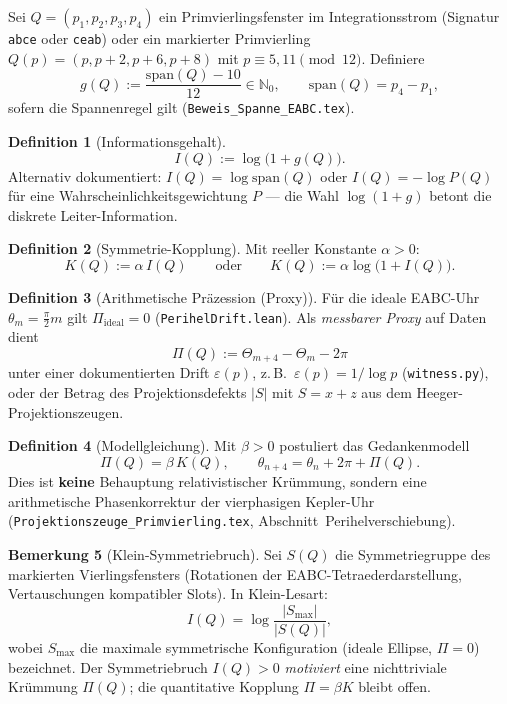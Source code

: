 \documentclass[11pt,a4paper]{article}
\theoremstyle{definition}
\newtheorem{definition}{Definition}[section]
\newtheorem{bemerkung}[definition]{Bemerkung}
\theoremstyle{remark}
\newcommand{\N}{\mathbb{N}}
\begin{document}
Sei $Q=(p_1,p_2,p_3,p_4)$ ein Primvierlingsfenster im Integrationsstrom
(Signatur \texttt{abce} oder \texttt{ceab}) oder ein markierter Primvierling
$Q(p)=(p,p+2,p+6,p+8)$ mit $p\equiv 5,11\pmod{12}$.
Definiere
\[
  g(Q):=\frac{\mathrm{span}(Q)-10}{12}\in\N_0,
  \qquad \mathrm{span}(Q)=p_4-p_1,
\]
sofern die Spannenregel gilt (\texttt{Beweis\_Spanne\_EABC.tex}).

\begin{definition}[Informationsgehalt]
  \[
  I(Q):=\log\bigl(1+g(Q)\bigr).
  \]
  Alternativ dokumentiert: $I(Q)=\log\mathrm{span}(Q)$ oder
  $I(Q)=-\log P(Q)$ für eine Wahrscheinlichkeitsgewichtung $P$ ---
  die Wahl $\log(1+g)$ betont die diskrete Leiter-Information.
\end{definition}

\begin{definition}[Symmetrie-Kopplung]
  Mit reeller Konstante $\alpha>0$:
  \[
  K(Q):=\alpha\,I(Q)
  \qquad\text{oder}\qquad
  K(Q):=\alpha\log\bigl(1+I(Q)\bigr).
  \]
\end{definition}

\begin{definition}[Arithmetische Präzession (Proxy)]
  Für die ideale EABC-Uhr $\theta_m=\tfrac{\pi}{2}m$ gilt
  $\Pi_{\mathrm{ideal}}=0$ (\texttt{PerihelDrift.lean}).
  Als \emph{messbarer Proxy} auf Daten dient
  \[
  \Pi(Q):=\Theta_{m+4}-\Theta_m-2\pi
  \]
  unter einer dokumentierten Drift $\varepsilon(p)$, z.\,B.\
  $\varepsilon(p)=1/\log p$ (\texttt{witness.py}), oder der Betrag des
  Projektionsdefekts $|S|$ mit $S=x+z$ aus dem Heeger-Projektionszeugen.
\end{definition}

\begin{definition}[Modellgleichung]
  Mit $\beta>0$ postuliert das Gedankenmodell
  \[
  \Pi(Q)=\beta\,K(Q),
  \qquad
  \theta_{n+4}=\theta_n+2\pi+\Pi(Q).
  \]
  Dies ist \textbf{keine} Behauptung relativistischer Krümmung, sondern eine
  arithmetische Phasenkorrektur der vierphasigen Kepler-Uhr
  (\texttt{Projektionszeuge\_Primvierling.tex}, Abschnitt~Perihelverschiebung).
\end{definition}

\begin{bemerkung}[Klein-Symmetriebruch]
  Sei $S(Q)$ die Symmetriegruppe des markierten Vierlingsfensters
  (Rotationen der EABC-Tetraederdarstellung, Vertauschungen kompatibler Slots).
  In Klein-Lesart:
  \[
  I(Q)=\log\frac{|S_{\max}|}{|S(Q)|},
  \]
  wobei $S_{\max}$ die maximale symmetrische Konfiguration (ideale Ellipse,
  $\Pi=0$) bezeichnet.
  Der Symmetriebruch $I(Q)>0$ \emph{motiviert} eine nichttriviale Krümmung
  $\Pi(Q)$; die quantitative Kopplung $\Pi=\beta K$ bleibt offen.
\end{bemerkung}
\end{document}
